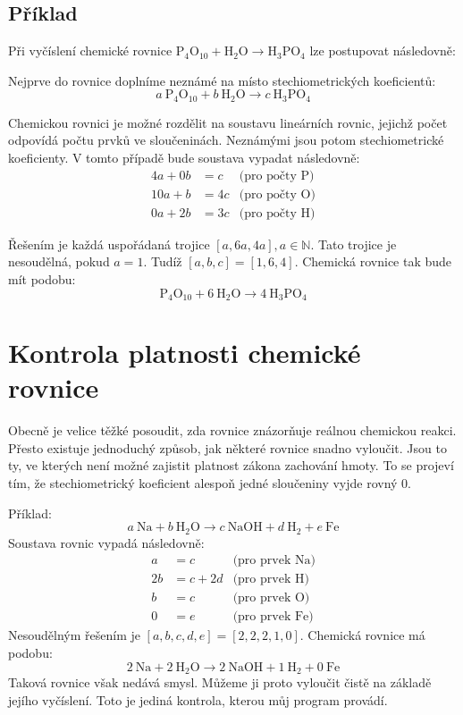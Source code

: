 \documentclass[12pt,a4paper]{report}
\newcommand{\n}[1]{\mbox{#1}}
\newcommand{\sipka}{\rightarrow}
\begin{document}
\subsection*{Příklad}
Při vyčíslení chemické rovnice $ \n{P}_4\n{O}_{10} + \n{H}_2\n{O} \sipka \n{H}_3\n{PO}_4 $ lze postupovat následovně:

Nejprve do rovnice doplníme neznámé na místo stechiometrických koeficientů:
$$ a~\n{P}_4\n{O}_{10} + b~\n{H}_2\n{O} \sipka c~\n{H}_3\n{PO}_4 $$

Chemickou rovnici je možné rozdělit na soustavu lineárních rovnic, jejichž počet odpovídá počtu prvků ve sloučeninách. Neznámými jsou potom stechio\-met\-ric\-ké koeficienty. V tomto případě bude soustava vypadat následovně:
\begin{align*}
	4a + 0b &= c&\mbox{(pro počty P)}\\
	10a + b &= 4c&\mbox{(pro počty O)}\\
	0a + 2b &= 3c&\mbox{(pro počty H)}
\end{align*}

Řešením je každá uspořádaná trojice $ [a, 6a, 4a], a\in \mathbb{N} $. Tato trojice je nesoudělná, pokud $ a = 1 $. Tudíž $ [a,b,c] = [1,6,4] $. Chemická rovnice tak bude mít podobu:
$$ \n{P}_4\n{O}_{10} + 6~\n{H}_2\n{O} \sipka 4~\n{H}_3\n{PO}_4 $$

\section{Kontrola platnosti chemické rovnice}
Obecně je velice těžké posoudit, zda rovnice znázorňuje reálnou chemickou reakci. Přesto existuje jednoduchý způsob, jak některé rovnice snadno vyloučit. Jsou to ty, ve kterých není možné zajistit platnost zákona zachování hmoty. To se projeví tím, že stechiometrický koeficient alespoň jedné sloučeniny vyjde rovný 0.

Příklad:
$$a~\n{Na} + b~\n{H}_2\n{O} \sipka c~\n{NaOH}+d~\n{H}_2 + e~\n{Fe}$$
Soustava rovnic vypadá následovně:
\begin{align*}
	a &= c &\mbox{(pro prvek Na)}\\
	2b &= c + 2d &\mbox{(pro prvek H)}\\
	b &= c &\mbox{(pro prvek O)}\\
	0 &= e &\mbox{(pro prvek Fe)}
\end{align*} 
Nesoudělným řešením je $[a,b,c,d,e]=[2,2,2,1,0]$. Chemická rovnice má podobu:
$$2~\n{Na} + 2~\n{H}_2\n{O} \sipka 2~\n{NaOH}+1~\n{H}_2 + 0~\n{Fe}$$
Taková rovnice však nedává smysl. Můžeme ji proto vyloučit čistě na základě jejího vyčíslení. Toto je jediná kontrola, kterou můj program provádí.
\end{document}
